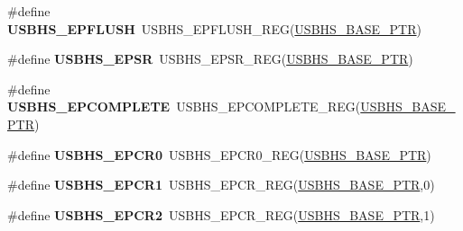 \begin{DoxyCompactItemize}
\item 
\hypertarget{group___u_s_b_h_s___register___accessor___macros_gad5520f37306155b856aa523f4f95db4d}{}\#define {\bfseries U\+S\+B\+H\+S\+\_\+\+E\+P\+F\+L\+U\+S\+H}~U\+S\+B\+H\+S\+\_\+\+E\+P\+F\+L\+U\+S\+H\+\_\+\+R\+E\+G(\hyperlink{group___u_s_b_h_s___peripheral_gaa2bc10b8cd66f96acd39e15b3a581306}{U\+S\+B\+H\+S\+\_\+\+B\+A\+S\+E\+\_\+\+P\+T\+R})\label{group___u_s_b_h_s___register___accessor___macros_gad5520f37306155b856aa523f4f95db4d}

\item 
\hypertarget{group___u_s_b_h_s___register___accessor___macros_ga620e4f112efac6006a08380dac0f0fa6}{}\#define {\bfseries U\+S\+B\+H\+S\+\_\+\+E\+P\+S\+R}~U\+S\+B\+H\+S\+\_\+\+E\+P\+S\+R\+\_\+\+R\+E\+G(\hyperlink{group___u_s_b_h_s___peripheral_gaa2bc10b8cd66f96acd39e15b3a581306}{U\+S\+B\+H\+S\+\_\+\+B\+A\+S\+E\+\_\+\+P\+T\+R})\label{group___u_s_b_h_s___register___accessor___macros_ga620e4f112efac6006a08380dac0f0fa6}

\item 
\hypertarget{group___u_s_b_h_s___register___accessor___macros_gab0e452ef6571e6526a9d16a7eba3de31}{}\#define {\bfseries U\+S\+B\+H\+S\+\_\+\+E\+P\+C\+O\+M\+P\+L\+E\+T\+E}~U\+S\+B\+H\+S\+\_\+\+E\+P\+C\+O\+M\+P\+L\+E\+T\+E\+\_\+\+R\+E\+G(\hyperlink{group___u_s_b_h_s___peripheral_gaa2bc10b8cd66f96acd39e15b3a581306}{U\+S\+B\+H\+S\+\_\+\+B\+A\+S\+E\+\_\+\+P\+T\+R})\label{group___u_s_b_h_s___register___accessor___macros_gab0e452ef6571e6526a9d16a7eba3de31}

\item 
\hypertarget{group___u_s_b_h_s___register___accessor___macros_gaa8705a4bd69a9dc71b46043c0cfe01aa}{}\#define {\bfseries U\+S\+B\+H\+S\+\_\+\+E\+P\+C\+R0}~U\+S\+B\+H\+S\+\_\+\+E\+P\+C\+R0\+\_\+\+R\+E\+G(\hyperlink{group___u_s_b_h_s___peripheral_gaa2bc10b8cd66f96acd39e15b3a581306}{U\+S\+B\+H\+S\+\_\+\+B\+A\+S\+E\+\_\+\+P\+T\+R})\label{group___u_s_b_h_s___register___accessor___macros_gaa8705a4bd69a9dc71b46043c0cfe01aa}

\item 
\hypertarget{group___u_s_b_h_s___register___accessor___macros_gaff86d9cc790e437cfc2103c816fbb008}{}\#define {\bfseries U\+S\+B\+H\+S\+\_\+\+E\+P\+C\+R1}~U\+S\+B\+H\+S\+\_\+\+E\+P\+C\+R\+\_\+\+R\+E\+G(\hyperlink{group___u_s_b_h_s___peripheral_gaa2bc10b8cd66f96acd39e15b3a581306}{U\+S\+B\+H\+S\+\_\+\+B\+A\+S\+E\+\_\+\+P\+T\+R},0)\label{group___u_s_b_h_s___register___accessor___macros_gaff86d9cc790e437cfc2103c816fbb008}

\item 
\hypertarget{group___u_s_b_h_s___register___accessor___macros_gaaa0c187c18dc5c25e5d2ccc7c612fcdd}{}\#define {\bfseries U\+S\+B\+H\+S\+\_\+\+E\+P\+C\+R2}~U\+S\+B\+H\+S\+\_\+\+E\+P\+C\+R\+\_\+\+R\+E\+G(\hyperlink{group___u_s_b_h_s___peripheral_gaa2bc10b8cd66f96acd39e15b3a581306}{U\+S\+B\+H\+S\+\_\+\+B\+A\+S\+E\+\_\+\+P\+T\+R},1)\label{group___u_s_b_h_s___register___accessor___macros_gaaa0c187c18dc5c25e5d2ccc7c612fcdd}


\end{DoxyCompactItemize}
